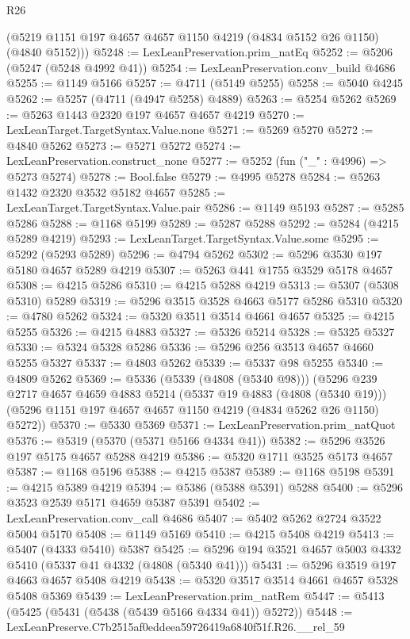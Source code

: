 \begin{lexlean}{R26}
\begin{coremodule}
      (@5219 @1151 @197 @4657 @4657 @1150 @4219 (@4834 @5152 @26 @1150) (@4840 @5152)))
@5248 := LexLeanPreservation.prim_natEq
@5252 := @5206 (@5247 (@5248 @4992 @41))
@5254 := LexLeanPreservation.conv_build @4686
@5255 := @1149 @5166
@5257 := @4711 (@5149 @5255)
@5258 := @5040 @4245
@5262 := @5257 (@4711 (@4947 @5258) @4889)
@5263 := @5254 @5262
@5269 := @5263 @1443 @2320 @197 @4657 @4657 @4219
@5270 := LexLeanTarget.TargetSyntax.Value.none
@5271 := @5269 @5270
@5272 := @4840 @5262
@5273 := @5271 @5272
@5274 := LexLeanPreservation.construct_none
@5277 := @5252 (fun ("_" : @4996) => @5273 @5274)
@5278 := Bool.false
@5279 := @4995 @5278
@5284 := @5263 @1432 @2320 @3532 @5182 @4657
@5285 := LexLeanTarget.TargetSyntax.Value.pair
@5286 := @1149 @5193
@5287 := @5285 @5286
@5288 := @1168 @5199
@5289 := @5287 @5288
@5292 := @5284 (@4215 @5289 @4219)
@5293 := LexLeanTarget.TargetSyntax.Value.some
@5295 := @5292 (@5293 @5289)
@5296 := @4794 @5262
@5302 := @5296 @3530 @197 @5180 @4657 @5289 @4219
@5307 := @5263 @441 @1755 @3529 @5178 @4657
@5308 := @4215 @5286
@5310 := @4215 @5288 @4219
@5313 := @5307 (@5308 @5310) @5289
@5319 := @5296 @3515 @3528 @4663 @5177 @5286 @5310
@5320 := @4780 @5262
@5324 := @5320 @3511 @3514 @4661 @4657
@5325 := @4215 @5255
@5326 := @4215 @4883
@5327 := @5326 @5214
@5328 := @5325 @5327
@5330 := @5324 @5328 @5286
@5336 := @5296 @256 @3513 @4657 @4660 @5255 @5327
@5337 := @4803 @5262
@5339 := @5337 @98 @5255
@5340 := @4809 @5262
@5369 := @5336
    (@5339 (@4808 (@5340 @98)))
    (@5296
      @239
      @2717
      @4657
      @4659
      @4883
      @5214
      (@5337 @19 @4883 (@4808 (@5340 @19)))
      (@5296 @1151 @197 @4657 @4657 @1150 @4219 (@4834 @5262 @26 @1150) @5272))
@5370 := @5330 @5369
@5371 := LexLeanPreservation.prim_natQuot
@5376 := @5319 (@5370 (@5371 @5166 @4334 @41))
@5382 := @5296 @3526 @197 @5175 @4657 @5288 @4219
@5386 := @5320 @1711 @3525 @5173 @4657
@5387 := @1168 @5196
@5388 := @4215 @5387
@5389 := @1168 @5198
@5391 := @4215 @5389 @4219
@5394 := @5386 (@5388 @5391) @5288
@5400 := @5296 @3523 @2539 @5171 @4659 @5387 @5391
@5402 := LexLeanPreservation.conv_call @4686
@5407 := @5402 @5262 @2724 @3522 @5004 @5170
@5408 := @1149 @5169
@5410 := @4215 @5408 @4219
@5413 := @5407 (@4333 @5410) @5387
@5425 := @5296 @194 @3521 @4657 @5003 @4332 @5410 (@5337 @41 @4332 (@4808 (@5340 @41)))
@5431 := @5296 @3519 @197 @4663 @4657 @5408 @4219
@5438 := @5320 @3517 @3514 @4661 @4657 @5328 @5408 @5369
@5439 := LexLeanPreservation.prim_natRem
@5447 := @5413 (@5425 (@5431 (@5438 (@5439 @5166 @4334 @41)) @5272))
@5448 := LexLeanPreserve.C7b2515af0eddeea59726419a6840f51f.R26.__rel_59

\end{coremodule}
\end{lexlean}

